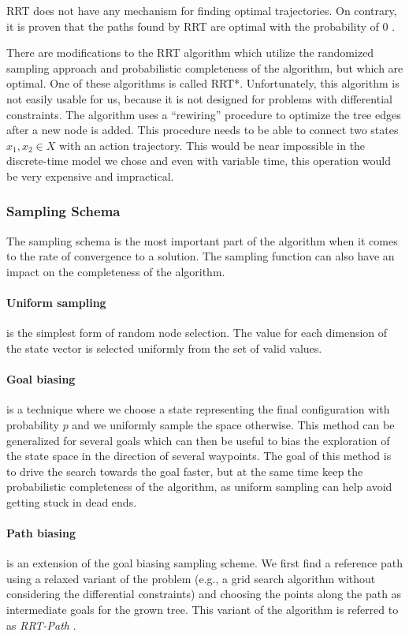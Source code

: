 \gls*{RRT} does not have any mechanism for finding optimal trajectories. On contrary, it is proven that the paths found by \gls*{RRT} are optimal with the probability of 0 \cite{RRT_star}.

There are modifications to the \gls*{RRT} algorithm which utilize the randomized sampling approach and probabilistic completeness of the algorithm, but which are optimal. One of these algorithms is called \gls{RRT*}. Unfortunately, this algorithm is not easily usable for us, because it is not designed for problems with differential constraints. The algorithm uses a ``rewiring'' procedure to optimize the tree edges after a new node is added. This procedure needs to be able to connect two states $x_1, x_2\in X$ with an action trajectory. This would be near impossible in the discrete-time model we chose and even with variable time, this operation would be very expensive and impractical.

\subsubsection{Sampling Schema}

The sampling schema is the most important part of the algorithm when it comes to the rate of convergence to a solution. The sampling function can also have an impact on the completeness of the algorithm.

\paragraph{Uniform sampling} is the simplest form of random node selection. The value for each dimension of the state vector is selected uniformly from the set of valid values.

\paragraph{Goal biasing} is a technique where we choose a state representing the final configuration with probability $p$ and we uniformly sample the space otherwise. This method can be generalized for several goals which can then be useful to bias the exploration of the state space in the direction of several waypoints. The goal of this method is to drive the search towards the goal faster, but at the same time keep the probabilistic completeness of the algorithm, as uniform sampling can help avoid getting stuck in dead ends.

\paragraph{Path biasing} is an extension of the goal biasing sampling scheme. We first find a reference path using a relaxed variant of the problem (e.g., a grid search algorithm without considering the differential constraints) and choosing the points along the path as intermediate goals for the grown tree. This variant of the algorithm is referred to as \textit{RRT-Path} \cite{RRT_guiding_path}.

